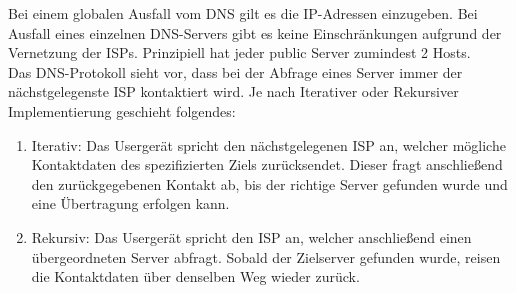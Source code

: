 \documentclass[11pt]{article}
\begin{document}
\begin{enumerate}[\thesection .1]
        Bei einem globalen Ausfall vom DNS gilt es die IP-Adressen einzugeben.
        Bei Ausfall eines einzelnen DNS-Servers gibt es keine Einschränkungen aufgrund der Vernetzung der ISPs.
        Prinzipiell hat jeder public Server zumindest 2 Hosts.\\

        Das DNS-Protokoll sieht vor, dass bei der Abfrage eines Server immer der nächstgelegenste ISP kontaktiert wird.
        Je nach Iterativer oder Rekursiver Implementierung geschieht folgendes:
        \begin{addmargin}[1em]{1em}
            \begin{enumerate}[$\diamond$]
                \item Iterativ: Das Usergerät spricht den nächstgelegenen ISP an, welcher mögliche Kontaktdaten des spezifizierten Ziels zurücksendet.
                Dieser fragt anschließend den zurückgegebenen Kontakt ab, bis der richtige Server gefunden wurde und eine Übertragung erfolgen kann.

                \item Rekursiv: Das Usergerät spricht den ISP an, welcher anschließend einen übergeordneten Server abfragt. Sobald der Zielserver gefunden wurde,
                reisen die Kontaktdaten über denselben Weg wieder zurück.

            \end{enumerate}
        \end{addmargin}
\end{enumerate}
\end{document}
